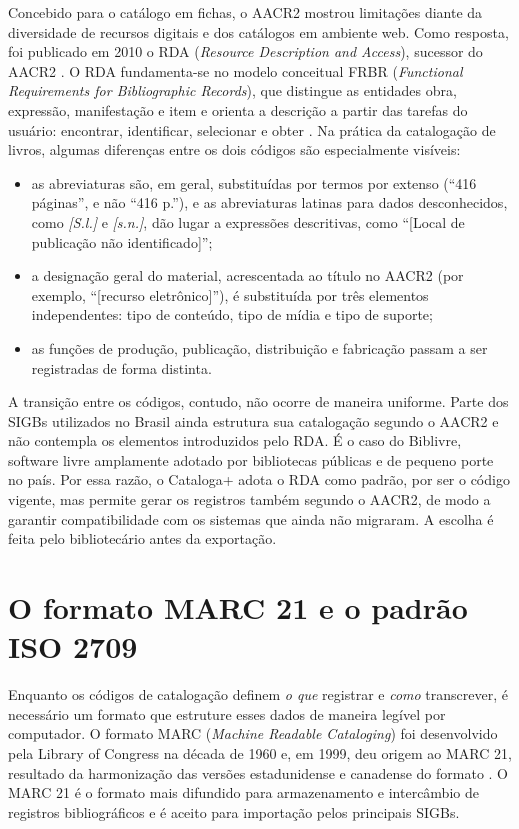 Concebido para o catálogo em fichas, o AACR2 mostrou limitações diante da diversidade de recursos digitais e dos catálogos em ambiente web. Como resposta, foi publicado em 2010 o RDA (\textit{Resource Description and Access}), sucessor do AACR2 \cite{rda2010}. O RDA fundamenta-se no modelo conceitual FRBR (\textit{Functional Requirements for Bibliographic Records}), que distingue as entidades obra, expressão, manifestação e item e orienta a descrição a partir das tarefas do usuário: encontrar, identificar, selecionar e obter \cite{ifla1998frbr}. Na prática da catalogação de livros, algumas diferenças entre os dois códigos são especialmente visíveis:

\begin{itemize}
    \item as abreviaturas são, em geral, substituídas por termos por extenso (``416 páginas'', e não ``416 p.''), e as abreviaturas latinas para dados desconhecidos, como \textit{[S.l.]} e \textit{[s.n.]}, dão lugar a expressões descritivas, como ``[Local de publicação não identificado]'';
    \item a designação geral do material, acrescentada ao título no AACR2 (por exemplo, ``[recurso eletrônico]''), é substituída por três elementos independentes: tipo de conteúdo, tipo de mídia e tipo de suporte;
    \item as funções de produção, publicação, distribuição e fabricação passam a ser registradas de forma distinta.
\end{itemize}

A transição entre os códigos, contudo, não ocorre de maneira uniforme. Parte dos SIGBs utilizados no Brasil ainda estrutura sua catalogação segundo o AACR2 e não contempla os elementos introduzidos pelo RDA. É o caso do Biblivre, software livre amplamente adotado por bibliotecas públicas e de pequeno porte no país.
Por essa razão, o Cataloga+ adota o RDA como padrão, por ser o código vigente, mas permite gerar os registros também segundo o AACR2, de modo a garantir compatibilidade com os sistemas que ainda não migraram. A escolha é feita pelo bibliotecário antes da exportação.

\section{O formato MARC 21 e o padrão ISO 2709}
\label{sec:marc}

Enquanto os códigos de catalogação definem \emph{o que} registrar e \emph{como} transcrever, é necessário um formato que estruture esses dados de maneira legível por computador. O formato MARC (\textit{Machine Readable Cataloging}) foi desenvolvido pela Library of Congress na década de 1960 e, em 1999, deu origem ao MARC 21, resultado da harmonização das versões estadunidense e canadense do formato \cite{loc2023}. O MARC 21 é o formato mais difundido para armazenamento e intercâmbio de registros bibliográficos e é aceito para importação pelos principais SIGBs.

